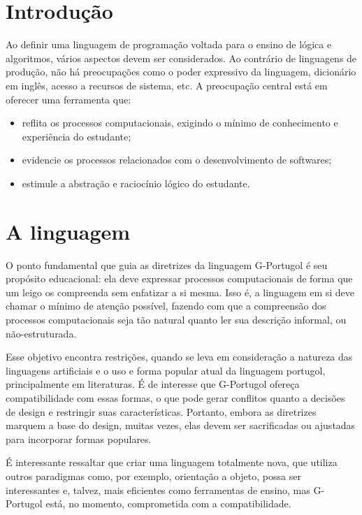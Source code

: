 \documentclass[a4paper,11pt]{report}
\begin{document}
\section{Introdução}

Ao definir uma linguagem de programação voltada para o ensino de lógica e
algoritmos, vários aspectos devem ser considerados. Ao contrário de linguagens
de produção, não há preocupações como o poder expressivo da linguagem,
dicionário em inglês, acesso a recursos de sistema, etc. A preocupação central
está em oferecer uma ferramenta que:

\begin{itemize}
  \item reflita os processos computacionais, exigindo o mínimo de conhecimento e
    experiência do estudante;
  \item evidencie os processos relacionados com o desenvolvimento de softwares;
  \item estimule a abstração e raciocínio lógico do estudante.
\end{itemize}

\section{A linguagem}

O ponto fundamental que guia as diretrizes da linguagem G-Portugol é seu
propósito educacional: ela deve expressar processos computacionais de forma que
um leigo os compreenda sem enfatizar a si mesma. Isso é, a linguagem em si deve
chamar o mínimo de atenção possível, fazendo com que a compreensão dos processos
computacionais seja tão natural quanto ler sua descrição informal, ou
não-estruturada.

Esse objetivo encontra restrições, quando se leva em consideração a natureza das
linguagens artificiais e o uso e forma popular atual da linguagem portugol,
principalmente em literaturas. É de interesse que G-Portugol ofereça
compatibilidade com essas formas, o que pode gerar conflitos quanto a decisões
de design e restringir suas características. Portanto, embora as diretrizes
marquem a base do design, muitas vezes, elas devem ser sacrificadas ou ajustadas
para incorporar formas populares.

É interessante ressaltar que criar uma linguagem totalmente nova, que utiliza
outros paradigmas como, por exemplo, orientação a objeto, possa ser
interessantes e, talvez, mais eficientes como ferramentas de ensino, mas
G-Portugol está, no momento, comprometida com a compatibilidade.
\end{document}
